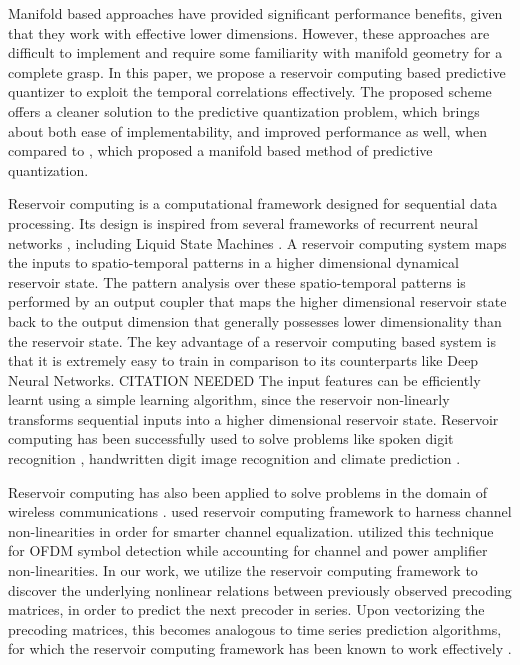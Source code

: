 \documentclass[conference]{IEEEtran}
\begin{document}
Manifold based approaches have provided significant performance benefits, given that they work with effective lower dimensions.
However, these approaches are difficult to implement and require some familiarity with manifold geometry for a complete grasp.
In this paper, we propose a reservoir computing based predictive quantizer to exploit the temporal correlations effectively.
The proposed scheme offers a cleaner solution to the predictive quantization problem, which brings about both ease of implementability, and improved performance as well, when compared to \cite{6891198}, which proposed a manifold based method of predictive quantization.

Reservoir computing is a computational framework designed for sequential data processing.
Its design is inspired from several frameworks of recurrent neural networks \cite{jaeger2004harnessing}, including Liquid State Machines \cite{jalalvand2015real}.
A reservoir computing system maps the inputs to spatio-temporal patterns in a higher dimensional dynamical reservoir state.
The pattern analysis over these spatio-temporal patterns is performed by an output coupler that maps the higher dimensional reservoir state back to the output dimension that generally possesses lower dimensionality than the reservoir state.
The key advantage of a reservoir computing based system is that it is extremely easy to train in comparison to its counterparts like Deep Neural Networks. CITATION NEEDED
The input features can be efficiently learnt using a simple learning algorithm, since the reservoir non-linearly transforms sequential inputs into a higher dimensional reservoir state.
Reservoir computing has been successfully used to solve problems like spoken digit recognition \cite{verstraeten2005isolated}, handwritten digit image recognition \cite{jalalvand2015real} and climate prediction \cite{pathak2017using}.

Reservoir computing has also been applied to solve problems in the domain of wireless communications \cite{jaeger2004harnessing,mosleh2017brain,shafin2018realizing}.
\cite{jaeger2004harnessing} used reservoir computing framework to harness channel non-linearities in order for smarter channel equalization.
\cite{mosleh2017brain,shafin2018realizing} utilized this technique for OFDM symbol detection while accounting for channel and power amplifier non-linearities.
In our work, we utilize the reservoir computing framework to discover the underlying nonlinear relations between previously observed precoding matrices, in order to predict the next precoder in series.
Upon vectorizing the precoding matrices, this becomes analogous to time series prediction algorithms, for which the reservoir computing framework has been known to work effectively \cite{mosleh2017brain}.
\end{document}
